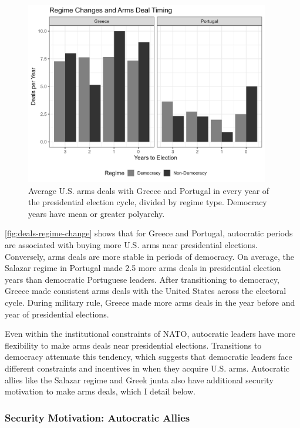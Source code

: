 \documentclass[12pt]{article}
\begin{document}
\begin{figure}[htpb]
	\centering
		\includegraphics[width=0.95\textwidth]{../figures/deals-regime-change.png}
	\caption{Average U.S. arms deals with Greece and Portugal in every year of the presidential election cycle, divided by regime type. Democracy years have mean or greater polyarchy.}
	\label{fig:deals-regime-change}
\end{figure}


\autoref{fig:deals-regime-change} shows that for Greece and Portugal, autocratic periods are associated with buying more U.S. arms near presidential elections.
Conversely, arms deals are more stable in periods of democracy. 
On average, the Salazar regime in Portugal made 2.5 more arms deals in presidential election years than democratic Portuguese leaders.
After transitioning to democracy, Greece made consistent arms deals with the United States across the electoral cycle.
During military rule, Greece made more arms deals in the year before and year of presidential elections.


Even within the institutional constraints of NATO, autocratic leaders have more flexibility to make arms deals near presidential elections. 
Transitions to democracy attenuate this tendency, which suggests that democratic leaders face different constraints and incentives in when they acquire U.S. arms. 
Autocratic allies like the Salazar regime and Greek junta also have additional security motivation to make arms deals, which I detail below. 



\subsubsection{Security Motivation: Autocratic Allies}
\end{document}
